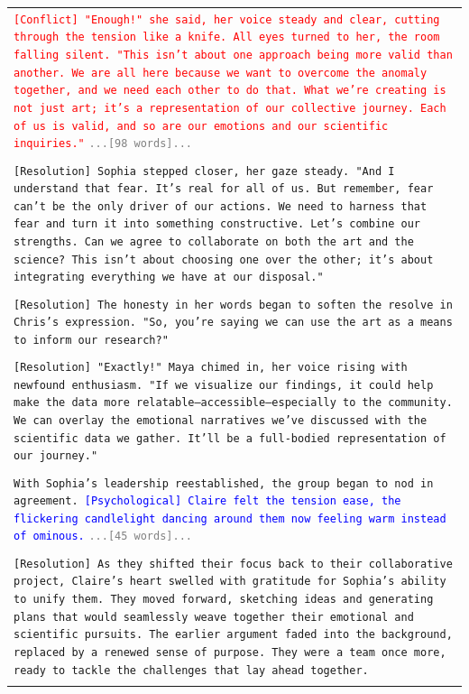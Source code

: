 \documentclass[letterpaper]{article} %
\begin{document}
\begin{small}
\begin{longtable}{p{\textwidth}}
    \texttt{\textcolor{red}{[Conflict] "Enough!" she said, her voice steady and clear, cutting through the tension like a knife. All eyes turned to her, the room falling silent. "This isn't about one approach being more valid than another. We are all here because we want to overcome the anomaly together, and we need each other to do that. What we're creating is not just art; it's a representation of our collective journey. Each of us is valid, and so are our emotions and our scientific inquiries."}}
    \texttt{\textcolor{gray}{...[98 words]...}} \\\\

    \texttt{\textcolor{resolu_color}{[Resolution] Sophia stepped closer, her gaze steady. "And I understand that fear. It's real for all of us. But remember, fear can't be the only driver of our actions. We need to harness that fear and turn it into something constructive. Let's combine our strengths. Can we agree to collaborate on both the art and the science? This isn't about choosing one over the other; it's about integrating everything we have at our disposal."}} \\\\

    \texttt{\textcolor{resolu_color}{[Resolution] The honesty in her words began to soften the resolve in Chris's expression. "So, you're saying we can use the art as a means to inform our research?"}} \\\\

    \texttt{\textcolor{resolu_color}{[Resolution] "Exactly!" Maya chimed in, her voice rising with newfound enthusiasm. "If we visualize our findings, it could help make the data more relatable—accessible—especially to the community. We can overlay the emotional narratives we've discussed with the scientific data we gather. It'll be a full-bodied representation of our journey."}} \\\\

    \texttt{With Sophia's leadership reestablished, the group began to nod in agreement. \textcolor{blue}{[Psychological] Claire felt the tension ease, the flickering candlelight dancing around them now feeling warm instead of ominous.}}
    \texttt{\textcolor{gray}{...[45 words]...}} \\\\

    \texttt{\textcolor{resolu_color}{[Resolution] As they shifted their focus back to their collaborative project, Claire's heart swelled with gratitude for Sophia's ability to unify them. They moved forward, sketching ideas and generating plans that would seamlessly weave together their emotional and scientific pursuits. The earlier argument faded into the background, replaced by a renewed sense of purpose. They were a team once more, ready to tackle the challenges that lay ahead together.}} \\\\


\end{longtable}
\end{small}
\end{document}
